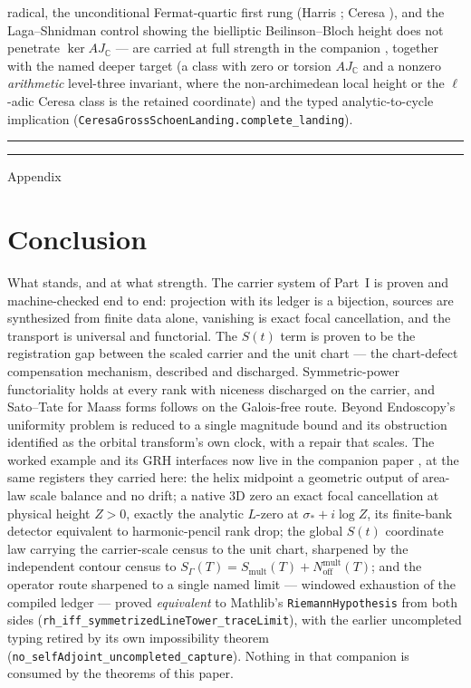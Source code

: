 \documentclass[11pt]{article}
\theoremstyle{definition}
\begin{document}
radical, the unconditional Fermat-quartic first rung (Harris \cite{Harris};
Ceresa \cite{Ceresa}), and the Laga--Shnidman control \cite{LagaShnidman}
showing the bielliptic Beilinson--Bloch height does not penetrate
$\ker AJ_{\mathbb C}$ --- are carried at full strength in the companion
\cite{HodgeCompanion}, together with the named deeper target (a class with
zero or torsion $AJ_{\mathbb C}$ and a nonzero \emph{arithmetic} level-three
invariant, where the non-archimedean local height \cite{ZhangGS} or the
$\ell$-adic Ceresa class is the retained coordinate) and the typed
analytic-to-cycle implication
(\texttt{CeresaGrossSchoenLanding.complete\_landing}). \\


\hrule\hrule
\newpage
{\huge Appendix}
\section*{Conclusion}

What stands, and at what strength. The carrier system of Part~I is proven and
machine-checked end to end: projection with its ledger is a bijection, sources
are synthesized from finite data alone, vanishing is exact focal cancellation,
and the transport is universal and functorial. The $S(t)$ term is proven to be
the registration gap between the scaled carrier and the unit chart --- the
chart-defect compensation mechanism, described and discharged. Symmetric-power
functoriality holds at every rank with niceness discharged on the carrier, and
Sato--Tate for Maass forms follows on the Galois-free route. Beyond Endoscopy's
uniformity problem is reduced to a single magnitude bound and its obstruction
identified as the orbital transform's own clock, with a repair that scales.
The worked example and its GRH interfaces now live in the companion paper
\cite{GRHCompanion}, at the same registers they carried here: the helix
midpoint a geometric output of area-law scale balance and no drift; a
native 3D zero an exact focal cancellation at physical height \(Z>0\),
exactly the analytic \(L\)-zero at \(\sigma_*+i\log Z\), its finite-bank
detector equivalent to harmonic-pencil rank drop; the global \(S(t)\)
coordinate law carrying the carrier-scale census to the unit chart,
sharpened by the independent contour census to
\(S_\Gamma(T)=S_{\mathrm{mult}}(T)+N_{\mathrm{off}}^{\mathrm{mult}}(T)\);
and the operator route sharpened to a single named limit --- windowed
exhaustion of the compiled ledger --- proved \emph{equivalent} to Mathlib's
\texttt{RiemannHypothesis} from both sides
(\texttt{rh\_iff\_symmetrizedLineTower\_traceLimit}), with the earlier
uncompleted typing retired by its own impossibility theorem
(\texttt{no\_selfAdjoint\_uncompleted\_capture}).  Nothing in that
companion is consumed by the theorems of this paper.
\end{document}
